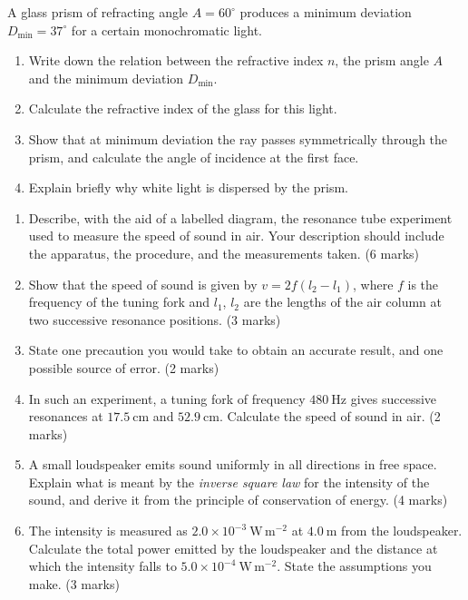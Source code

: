 \documentclass[11pt]{article}
\newcounter{popsec}
\newcounter{popsub}
\newcommand{\courssub}[1]{%
  \stepcounter{popsub}%
  \par\vspace{9pt}\noindent{\popxbold\fontsize{11.5}{13}\selectfont\color{popink}{\color{poporange}\thepopsec.\thepopsub}\hspace{6pt}#1}\par\nopagebreak\vspace{4pt}
}
\begin{document}
\begin{exercice}
A glass prism of refracting angle $A = 60^{\circ}$ produces a minimum deviation $D_{\min} = 37^{\circ}$ for a certain monochromatic light.
\begin{enumerate}
\item Write down the relation between the refractive index $n$, the prism angle $A$ and the minimum deviation $D_{\min}$.
\item Calculate the refractive index of the glass for this light.
\item Show that at minimum deviation the ray passes symmetrically through the prism, and calculate the angle of incidence at the first face.
\item Explain briefly why white light is dispersed by the prism.
\end{enumerate}
\end{exercice}

\courssub{I prepare for the GCE}

\begin{exercice}
\begin{enumerate}
\item Describe, with the aid of a labelled diagram, the resonance tube experiment used to measure the speed of sound in air. Your description should include the apparatus, the procedure, and the measurements taken. \hfill (6 marks)
\item Show that the speed of sound is given by $v = 2f(l_{2}-l_{1})$, where $f$ is the frequency of the tuning fork and $l_{1}$, $l_{2}$ are the lengths of the air column at two successive resonance positions. \hfill (3 marks)
\item State one precaution you would take to obtain an accurate result, and one possible source of error. \hfill (2 marks)
\item In such an experiment, a tuning fork of frequency $480\ \mathrm{Hz}$ gives successive resonances at $17.5\ \mathrm{cm}$ and $52.9\ \mathrm{cm}$. Calculate the speed of sound in air. \hfill (2 marks)
\item A small loudspeaker emits sound uniformly in all directions in free space. Explain what is meant by the \emph{inverse square law} for the intensity of the sound, and derive it from the principle of conservation of energy. \hfill (4 marks)
\item The intensity is measured as $2.0\times10^{-3}\ \mathrm{W\,m^{-2}}$ at $4.0\ \mathrm{m}$ from the loudspeaker. Calculate the total power emitted by the loudspeaker and the distance at which the intensity falls to $5.0\times10^{-4}\ \mathrm{W\,m^{-2}}$. State the assumptions you make. \hfill (3 marks)
\end{enumerate}
\end{exercice}
\end{document}
